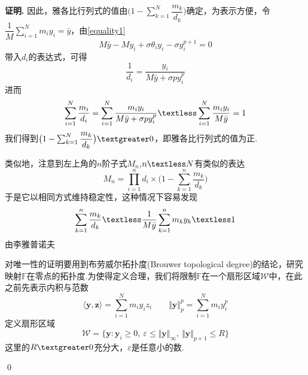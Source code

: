 \documentclass[11pt,a4paper]{article}
\theoremstyle{definition}
\renewenvironment{proof}{\par\textbf{证明.}\;}{\qed\par}
\begin{document}
\begin{proof}
		因此，雅各比行列式的值由$\big(1-\sum_{k=1}^{N}\dfrac{m_{k}}{d_{k}}\big)$确定，为表示方便，令$\dfrac{1}{M}\sum_{i=1}^{N}m_{i}y_{i}=\bar{y}$，由\eqref{equality1}\[ M\bar{y}-My_{i}+\sigma\theta_{i}y_{i}-\sigma y_{i}^{p+1}=0 \]
		带入$d_{i}$的表达式，可得\[ \dfrac{1}{d_{i}}=\dfrac{y_{i}}{M\bar{y}+\sigma py_{i}^{p}} \]
		进而\[ \sum_{i=1}^{N}\dfrac{m_{i}}{d_{i}}=\sum_{i=1}^{N}\dfrac{m_{i}y_{i}}{M\bar{y}+\sigma py_{i}^{p}}\textless\sum_{i=1}^{N}\dfrac{m_{i}y_{i}}{M\bar{y}}=1 \]我们得到$\big(1-\sum_{k=1}^{N}\dfrac{m_{k}}{d_{k}}\big)\textgreater0$，即雅各比行列式的值为正.
		
		类似地，注意到左上角的$n$阶子式$M_{n}$,$n\textless N$有类似的表达\[ M_{n}=\prod_{i=1}^{n}d_{i}\times\big(1-\sum_{k=1}^{n}\dfrac{m_{k}}{d_{k}}\big) \]于是它以相同方式维持稳定性，这种情况下容易发现\[ \sum_{k=1}^{n}\dfrac{m_{k}}{d_{k}}\textless\dfrac{
		1}{M\bar{y}}\sum_{k=1}^{n}m_{k}y_{k}\textless1 \]
		由李雅普诺夫
		
		对唯一性的证明要用到布劳威尔拓扑度(Brouwer topological degree)的结论\cite{ref3}，研究映射$\mathbb{F}$在零点的拓扑度.为使得定义合理，我们将限制$\mathbb{F}$在一个扇形区域$\mathcal{W}$中，在此之前先表示内积与范数\[ \langle\textbf{y},\textbf{z}\rangle=\sum_{i=1}^{N}m_{i}y_{i}z_{i}\qquad \Vert\textbf{y}\Vert_{p}^{p}=\sum_{i=1}^{N}m_{i}y_{i}^{p} \]
		定义扇形区域\[ \mathcal{W}=\{\textbf{y}:\textbf{y}_{i}\geq0,\ \varepsilon\leq\Vert\textbf{y}\Vert_{\infty},\ \Vert\textbf{y}\Vert_{p+1}\leq R\}\]这里的$R\textgreater0$充分大，$\varepsilon$是任意小的数.
		

\end{proof}
\end{document}
